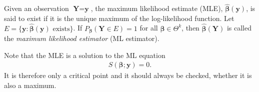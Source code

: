 \begin{definition} 
\label{def:MLE}
Given an observation $\textbf{Y}=\textbf{y}$, the maximum likelihood estimate (MLE), $\hat{\boldsymbol{\beta}}(\textbf{y})$, is said to exist if it is the unique maximum of the log-likelihood function. 
Let $E = \{ \textbf{y} : \hat{\boldsymbol{\beta}}(\textbf{y}) \text{ exists} \}$. If $P_{\boldsymbol{\beta}}(\textbf{Y} \in E) = 1$ for all $\boldsymbol{\beta} \in \Theta^k$, then $\hat{\boldsymbol{\beta}}(\textbf{Y})$ is called the \textit{maximum likelihood estimator} (ML estimator).
\end{definition}
Note that the MLE is a solution to the ML equation
\begin{align*}
    S(\boldsymbol{\beta}; \textbf{y}) = 0.
\end{align*}
It is therefore only a critical point and it should always be checked, whether it is also a maximum. 

